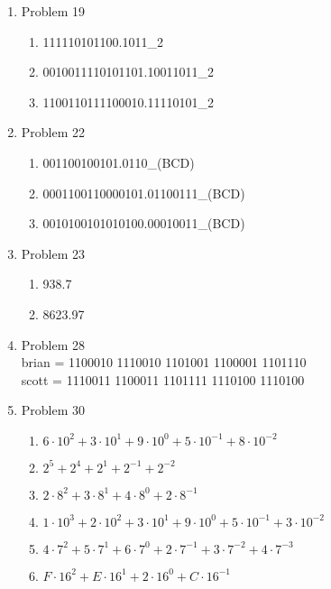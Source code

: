 \begin{enumerate}[leftmargin=2cm,labelsep=.5cm,label=\bf\arabic*.]
\item Problem 19
\begin{enumerate}
  \item 111110101100.1011_2
  \item 0010011110101101.10011011_2
  \item 1100110111100010.11110101_2\\[1cm]
\end{enumerate}

\item Problem 22
\begin{enumerate}
  \item 001100100101.0110_{(BCD)}
  \item 0001100110000101.01100111_{(BCD)}
  \item 0010100101010100.00010011_{(BCD)}\\[1cm]
\end{enumerate}

\item Problem 23
\begin{enumerate}
  \item 938.7
  \item 8623.97\\[1cm]
\end{enumerate}

\item Problem 28\\
brian = 1100010 1110010 1101001 1100001 1101110\\
scott = 1110011 1100011 1101111 1110100 1110100\\[1cm]

\item Problem 30
\begin{enumerate}
  \item $6 \cdot 10^2 + 3 \cdot 10^1 + 9 \cdot 10^0 + 5 \cdot 10^{-1} + 8 \cdot 10^{-2}$
  \item $2^5 + 2^4 + 2^1 + 2^{-1} + 2^{-2}$
  \item $2 \cdot 8^2 + 3 \cdot 8^1 + 4 \cdot 8^0 + 2 \cdot 8^{-1}$
  \item $1 \cdot 10^3 + 2 \cdot 10^2 + 3 \cdot 10^1 + 9 \cdot 10^0 + 5 \cdot 10^{-1} + 3 \cdot 10^{-2}$
  \item $4 \cdot 7^2 + 5 \cdot 7^1 + 6 \cdot 7^0 + 2 \cdot 7^{-1} + 3 \cdot 7^{-2} + 4 \cdot 7^{-3}$
  \item $F \cdot 16^2 + E \cdot 16^1 + 2 \cdot 16^0 + C \cdot 16^{-1}$
\end{enumerate}
\end{enumerate}